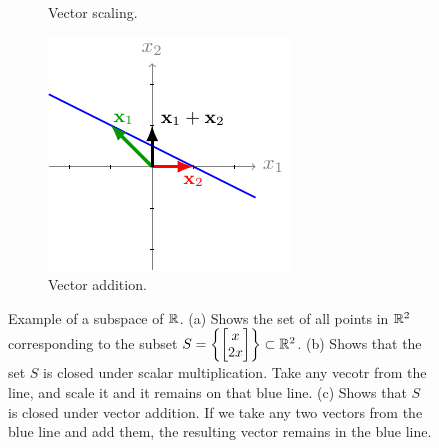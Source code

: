 \begin{example}
\begin{figure}[h]
\begin{subfigure}[b]{0.32\textwidth}
            \caption{Vector scaling.}
            \label{fig:nosubspace1-scale}
        \end{subfigure}
        \begin{subfigure}[b]{0.32\textwidth}
            \centering
            \includegraphics{figure/chapter01/nosubspace1(c).pdf}
            \caption{Vector addition.}
            \label{fig:nosubspace1-addition}
        \end{subfigure}
        \caption{Example of a subspace of $\mathbb{R}$. (a) Shows the set of all points in $\mathbb{R}^2$ corresponding to the subset $S = \left\{ \bmxc x \\ 2 x\emx\right\} \subset \mb{R}^2$. (b) Shows that the set $S$ is closed under scalar multiplication. Take any vecotr from the line, and scale it and it remains on that blue line. (c) Shows that $S$ is closed under vector addition. If we take any two vectors from the blue line and add them, the resulting vector remains in the blue line.}
    \end{figure}
    \label{example:nosubspace-straight-line}
\end{example}

